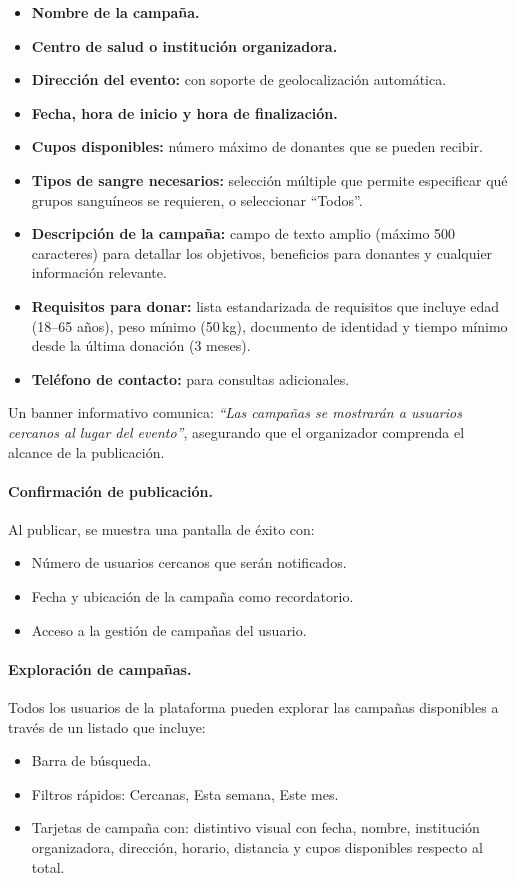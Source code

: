\documentclass[12pt, a4paper]{article}
\begin{document}
\begin{itemize}
    \item \textbf{Nombre de la campaña.}
    \item \textbf{Centro de salud o institución organizadora.}
    \item \textbf{Dirección del evento:} con soporte de geolocalización automática.
    \item \textbf{Fecha, hora de inicio y hora de finalización.}
    \item \textbf{Cupos disponibles:} número máximo de donantes que se pueden recibir.
    \item \textbf{Tipos de sangre necesarios:} selección múltiple que permite especificar qué grupos sanguíneos se requieren, o seleccionar ``Todos''.
    \item \textbf{Descripción de la campaña:} campo de texto amplio (máximo 500 caracteres) para detallar los objetivos, beneficios para donantes y cualquier información relevante.
    \item \textbf{Requisitos para donar:} lista estandarizada de requisitos que incluye edad (18--65 años), peso mínimo (50\,kg), documento de identidad y tiempo mínimo desde la última donación (3 meses).
    \item \textbf{Teléfono de contacto:} para consultas adicionales.
\end{itemize}

Un banner informativo comunica: \textit{``Las campañas se mostrarán a usuarios cercanos al lugar del evento''}, asegurando que el organizador comprenda el alcance de la publicación.

\paragraph{Confirmación de publicación.}
Al publicar, se muestra una pantalla de éxito con:
\begin{itemize}
    \item Número de usuarios cercanos que serán notificados.
    \item Fecha y ubicación de la campaña como recordatorio.
    \item Acceso a la gestión de campañas del usuario.
\end{itemize}

\paragraph{Exploración de campañas.}
Todos los usuarios de la plataforma pueden explorar las campañas disponibles a través de un listado que incluye:
\begin{itemize}
    \item Barra de búsqueda.
    \item Filtros rápidos: Cercanas, Esta semana, Este mes.
    \item Tarjetas de campaña con: distintivo visual con fecha, nombre, institución organizadora, dirección, horario, distancia y cupos disponibles respecto al total.
\end{itemize}
\end{document}
